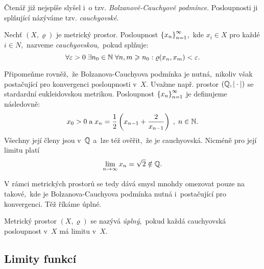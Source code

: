 Čtenář již nejspíše slyšel i~o tzv. \emph{Bolzanově-Cauchyově podmínce}. Posloupnosti ji splňující názýváme tzv. \emph{cauchyovské}.
\begin{definition}\label{def:cauchyovska-posloupnost}
    Nechť $(X,\varrho)$ je metrický prostor. Posloupnost $\left\{x_n\right\}_{n=1}^\infty$,~kde $x_i\in X$ pro každé $i\in N$,~nazveme \emph{cauchyovskou},~pokud splňuje:
    \[\forall\varepsilon>0\;\exists n_0\in\mathbb{N}\;\forall n,m\geqslant n_0:\varrho(x_n,x_m)<\varepsilon.\]
\end{definition}
Připomeňme rovněž,~že Bolzanova-Cauchyova podmínka je nutná,~nikoliv však postačující pro konvergenci posloupnosti v~$X$. Uvažme např. prostor $(\mathbb{Q},|\cdot|)$ se stardardní eukleidovskou metrikou. Posloupnost $\left\{x_n\right\}_{n=1}^\infty$ je definujeme následovně:
\[x_0>0\;\text{a}\;x_n=\dfrac{1}{2}\left(x_{n-1}+\dfrac{2}{x_{n-1}}\right)\;,\;n\in\mathbb{N}.\]
Všechny její členy jsou v~$\mathbb{Q}$ a~lze též ověřit,~že je cauchyovská. Nicméně pro její limitu platí
\[\lim_{n\to\infty}x_n=\sqrt{2}\notin\mathbb{Q}.\]

V rámci metrických prostorů se tedy dává smysl mnohdy omezovat pouze na takové,~kde je Bolzanova-Cauchyova podmínka nutná i~postačující pro konvergenci. Těž říkáme úplné.
\begin{definition}\label{def:uplny-mp}
    Metrický prostor $(X,\varrho)$ se nazývá \emph{úplný},~pokud každá cauchyovská posloupnost v~$X$ má limitu v~$X$.
\end{definition}

\subsection{Limity funkcí}\label{subsec:limity-fci}

